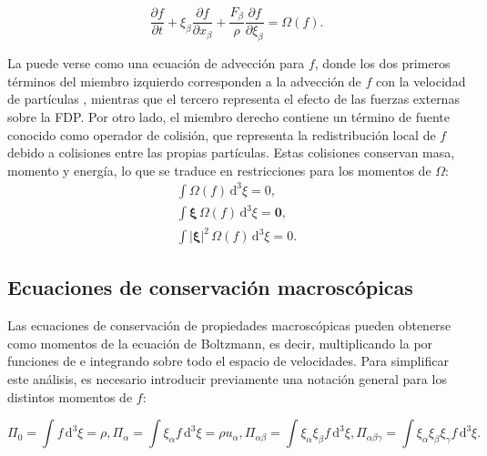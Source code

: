 \begin{equation}
	\dfrac{\partial f}{\partial t}  +  \xi_{\beta} \dfrac{\partial f}{\partial x_{\beta}}            +  \dfrac{F_{\beta}}{\rho} \dfrac{\partial f}{\partial \xi_{\beta}} =\Omega(f).
	\label{eq:boltz}
\end{equation}

La  puede verse como una ecuaci\'on de advecci\'on para $f$, donde los dos primeros t\'erminos del miembro izquierdo corresponden a la advecci\'on de $f$ con la velocidad de part\'iculas \bxi{}, mientras que el tercero representa el efecto de las fuerzas externas sobre la FDP. Por otro lado, el miembro derecho contiene un t\'ermino de fuente conocido como operador de colisi\'on, que representa la redistribuci\'on local de $f$ debido a colisiones entre las propias part\'iculas. Estas colisiones conservan masa, momento y energ\'ia, lo que se traduce en restricciones para los momentos de $\Omega$:
\begin{subequations}
	\begin{align}
		\int \Omega(f) \, \mbox{d}^3 \xi = 0, \\
		\int \bm{\xi} \, \Omega(f) \, \mbox{d}^3 \xi = \bm{0}, \\		
		\int |\bm{\xi}|^2 \, \Omega(f) \, \mbox{d}^3 \xi = 0. 	
	\end{align}
	\label{eq:omega_restrict}
\end{subequations}


\subsection{Ecuaciones de conservaci\'on macrosc\'opicas}
\label{sec:cons_macro}
Las ecuaciones de conservaci\'on de propiedades macrosc\'opicas pueden obtenerse como momentos de la ecuaci\'on de Boltzmann, es decir, multiplicando la  por funciones de \bxi{} e integrando sobre todo el espacio de velocidades. Para simplificar este an\'alisis, es necesario introducir previamente una notaci\'on general para los distintos momentos de $f$:

\begin{subequations}
	\begin{equation}
		\Pi_0 = \int f \, \mbox{d}^3 \xi = \rho,
	\end{equation}
	\begin{equation}
		\Pi_{\alpha} = \int \xi_{\alpha} f \, \mbox{d}^3 \xi = \rho u_{\alpha},
	\end{equation}
	\begin{equation}
		\Pi_{\alpha \beta} = \int \xi_{\alpha} \xi_{\beta} f \, \mbox{d}^3 \xi,
	\end{equation}
	\begin{equation}
		\Pi_{\alpha \beta \gamma} = \int \xi_{\alpha} \xi_{\beta} \xi_{\gamma} f \, \mbox{d}^3 \xi.
	\end{equation}
	\label{eq:f_moments}
\end{subequations}

